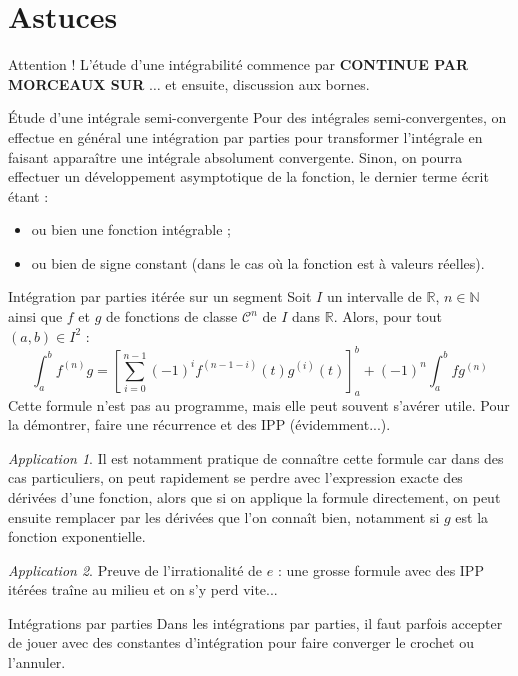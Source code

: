 \documentclass[french]{book}
\newcommand{\N}{\mathbb{N}}
\newcommand{\R}{\mathbb{R}}
\theoremstyle{plain}
\theoremstyle{definition}
\theoremstyle{remark}
\newtheorem*{app}{Application}
\begin{document}
\section{Astuces}
\begin{AS}{Attention !} L'étude d'une intégrabilité commence par \textbf{CONTINUE PAR MORCEAUX SUR} $\ldots$ et ensuite, discussion aux bornes.
\end{AS}
\begin{AS}{Étude d'une intégrale semi-convergente} Pour des intégrales semi-convergentes, on effectue en général une intégration par parties pour transformer l'intégrale en faisant apparaître une intégrale absolument convergente. Sinon, on pourra effectuer un développement asymptotique de la fonction, le dernier terme écrit étant :\begin{itemize}
	\item ou bien une fonction intégrable ;
	\item ou bien de signe constant (dans le cas où la fonction est à valeurs réelles).
\end{itemize}
\end{AS}\begin{AS}{Intégration par parties itérée sur un segment} Soit $I$ un intervalle de $\R$, $ n\in\N$ ainsi que $f$ et $g$ de fonctions de classe $\mathcal{C}^n$ de $I$ dans $\R$. Alors, pour tout $(a,b)\in I^2$ : $$\int_{a}^{b}f^{(n)}g=\left[\sum_{i=0}^{n-1}(-1)^if^{(n-1-i)}(t)g^{(i)}(t)\right]_a^b+(-1)^n\int_{a}^{b}fg^{(n)}$$ Cette formule n'est pas au programme, mais elle peut souvent s'avérer utile. Pour la démontrer, faire une récurrence et des IPP (évidemment...).
\end{AS}
\begin{app}
	Il est notamment pratique de connaître cette formule car dans des cas particuliers, on peut rapidement se perdre avec l'expression exacte des dérivées d'une fonction, alors que si on applique la formule directement, on peut ensuite remplacer par les dérivées que l'on connaît bien, notamment si $g$ est la fonction exponentielle.
\end{app}
\begin{app}
	Preuve de l'irrationalité de $e$ : une grosse formule avec des IPP itérées traîne au milieu et on s'y perd vite...
\end{app}
\begin{AS}{Intégrations par parties} Dans les intégrations par parties, il faut parfois accepter de jouer avec des constantes d'intégration pour faire converger le crochet ou l'annuler.
\end{AS}
\end{document}
